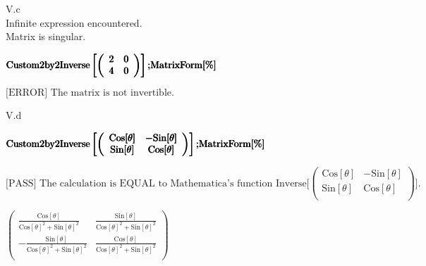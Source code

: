 \documentclass[11pt,a4paper]{article}
\begin{document}
\hfill \break
V.c\\
Infinite expression encountered.\\
Matrix is singular.

\begin{doublespace}
\noindent\(\pmb{\text{Custom2by2Inverse}\left[\left(
\begin{array}{cc}
 2 & 0 \\
 4 & 0 \\
\end{array}
\right)\right];}\\
\pmb{\text{MatrixForm}[\%]}\)
\end{doublespace}

\noindent\(\text{[ERROR] The matrix is not invertible.}\)

\hfill \break
V.d\\
\begin{doublespace}
\noindent\(\pmb{\text{Custom2by2Inverse}\left[\left(
\begin{array}{cc}
 \text{Cos}[\theta ] & -\text{Sin}[\theta ] \\
 \text{Sin}[\theta ] & \text{Cos}[\theta ] \\
\end{array}
\right)\right];}\\
\pmb{\text{MatrixForm}[\%]}\)
\end{doublespace}

\noindent\(\text{[PASS] The calculation is EQUAL to Mathematica's function Inverse[}\left(
\begin{array}{cc}
 \text{Cos}[\theta ] & -\text{Sin}[\theta ] \\
 \text{Sin}[\theta ] & \text{Cos}[\theta ] \\
\end{array}
\right)\text{].}\)

\begin{doublespace}
\noindent\(\left(
\begin{array}{cc}
 \frac{\text{Cos}[\theta ]}{\text{Cos}[\theta ]^2+\text{Sin}[\theta ]^2} & \frac{\text{Sin}[\theta ]}{\text{Cos}[\theta ]^2+\text{Sin}[\theta ]^2}
\\
 -\frac{\text{Sin}[\theta ]}{\text{Cos}[\theta ]^2+\text{Sin}[\theta ]^2} & \frac{\text{Cos}[\theta ]}{\text{Cos}[\theta ]^2+\text{Sin}[\theta ]^2}
\\
\end{array}
\right)\)
\end{doublespace}

\clearpage
\end{document}

